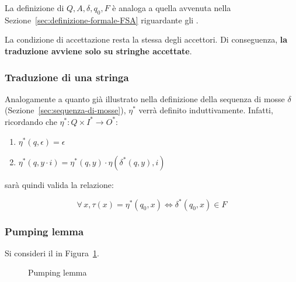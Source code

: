 \documentclass[italian, 10pt]{article}
\begin{document}
La definizione di \(Q, A, \delta, q_0, F\) è analoga a quella avvenuta nella Sezione~\ref{sec:definizione-formale-FSA} riguardante gli \FSA.

La condizione di accettazione resta la stessa degli accettori.
Di conseguenza, \textbf{la traduzione avviene solo su stringhe accettate}.

\subsubsection{Traduzione di una stringa}

Analogamente a quanto già illustrato nella definizione della sequenza di mosse \(\delta\) (Sezione~\ref{sec:sequenza-di-mosse}), \(\eta^\ast\) verrà definito induttivamente.
Infatti, ricordando che \(\eta^\ast : Q \times I^\ast \rightarrow O^\ast \):

\begin{enumerate}
  \item \(\eta^\ast(q, \epsilon) = \epsilon\)
  \item \(\eta^\ast(q, y \cdot i) = \eta^\ast(q, y) \cdot \eta\left(\delta^\ast(q, y), i\right)\)
\end{enumerate}

sarà quindi valida la relazione:

\[\forall \, x, \tau(x) = \eta^\ast (q_0, x) \Leftrightarrow \delta^\ast(q_0, x) \in F\]

\subsubsection{Pumping lemma}
\label{sec:pumping-lemma}

Si consideri il \FSA in Figura~\ref{fig:pumping-lemma-FSA}.

\begin{figure}[htbp]
  \bigskip
  \centering
  \caption{Pumping lemma}
  \label{fig:pumping-lemma-FSA}
  \bigskip
\end{figure}
\end{document}
